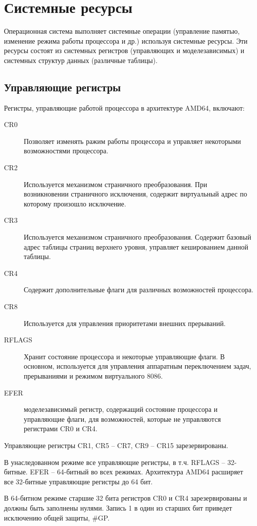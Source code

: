 \section{Системные ресурсы}
Операционная система выполняет системные операции (управление памятью, изменение режима работы процессора и др.)
используя системные ресурсы. Эти ресурсы состоят из системных регистров (управляющих и моделезависимых)
и системных структур данных (различные таблицы).

\subsection*{Управляющие регистры}
Регистры, управляющие работой процессора в архитектуре AMD64, включают:
\begin{description}
	\item[CR0] Позволяет изменять ражим работы процессора и управляет некоторыми возможностями процессора.
	\item[CR2] Используется механизмом страничного преобразования. При возникновении страничного исключения, содержит
		виртуальный адрес по которому произошло исключение.
	\item[CR3] Используется механизмом страничного преобразования. Содержит базовый адрес таблицы страниц верхнего
		уровня, управляет кешированием данной таблицы.
	\item[CR4] Содержит дополнительные флаги для различных возможностей процессора.
	\item[CR8] Используется для управления приоритетами внешних прерываний.
	\item[RFLAGS] Хранит состояние процессора и некоторые управляющие флаги. В основном, используется для
		управления аппаратным переключением задач, прерываниями и режимом виртуального 8086.
	\item[EFER] моделезависимый регистр, содержащий состояние процессора и управляющие флаги, для
		возможностей, которые не управляются регистрами CR0 и CR4.
\end{description}

Управляющие регистры CR1, CR5 -- CR7, CR9 -- CR15 зарезервированы.

В унаследованном режиме все управляющие регистры, в т.ч. RFLAGS -- 32-битные. EFER -- 64-битный во всех режимах.
Архитектура AMD64 расширяет все 32-битные управляющие регистры до 64 бит.

В 64-битном режиме старшие 32 бита регистров CR0 и CR4 зарезервированы и должны быть заполнены нулями.
Запись 1 в один из старших бит приведет исключению общей защиты, \#GP.

